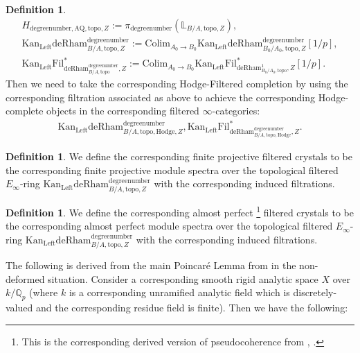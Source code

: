 \documentclass[11pt]{book}
\theoremstyle{definition}
\newtheorem{definition}[theorem]{Definition}
\numberwithin{equation}{section}
\begin{document}
\begin{definition}
\begin{align}
H_{\text{degreenumber},{\mathrm{AQ}},\mathrm{topo},Z}:=\pi_\text{degreenumber} (\mathbb{L}_{B/A,\mathrm{topo},Z}),	\\
\mathrm{Kan}_\mathrm{Left}\mathrm{deRham}^\text{degreenumber}_{B/A,\mathrm{topo},Z}:=\mathrm{Colim}_{A_0\rightarrow B_0}\mathrm{Kan}_\mathrm{Left}\mathrm{deRham}^\text{degreenumber}_{B_0/A_0,\mathrm{topo},Z}[1/p],\\
\mathrm{Kan}_\mathrm{Left}\mathrm{Fil}^*_{\mathrm{deRham}^\text{degreenumber}_{B/A,\mathrm{topo}},Z}:=\mathrm{Colim}_{A_0\rightarrow B_0}\mathrm{Kan}_\mathrm{Left}\mathrm{Fil}^*_{\mathrm{deRham}^1_{B_0/A_0,\mathrm{topo}},Z}[1/p].
\end{align}
Then we need to take the corresponding Hodge-Filtered completion by using the corresponding filtration associated as above to achieve the corresponding Hodge-complete objects in the corresponding filtered $\infty$-categories:
\begin{align}
\mathrm{Kan}_\mathrm{Left}{\mathrm{deRham}}^\text{degreenumber}_{B/A,\mathrm{topo,Hodge},Z},\mathrm{Kan}_\mathrm{Left}\mathrm{Fil}^*_{{\mathrm{deRham}}^\text{degreenumber}_{B/A,\mathrm{topo,Hodge}},Z}.	
\end{align} 	
\end{definition}


\begin{definition}
We define the corresponding finite projective filtered crystals to be the corresponding finite projective module spectra over the topological filtered $E_\infty$-ring $\mathrm{Kan}_\mathrm{Left}\mathrm{deRham}^\text{degreenumber}_{B/A,\mathrm{topo},Z}$ with the corresponding induced filtrations.	
\end{definition}


\begin{definition}
We define the corresponding almost perfect \footnote{This is the corresponding derived version of pseudocoherence from \cite{12Lu1}, \cite{12Lu2}.} filtered crystals to be the corresponding almost perfect module spectra over the topological filtered $E_\infty$-ring $\mathrm{Kan}_\mathrm{Left}\mathrm{deRham}^\text{degreenumber}_{B/A,\mathrm{topo},Z}$ with the corresponding induced filtrations.	
\end{definition}

\indent The following is derived from the main Poincar\'e Lemma from \cite[Theorem 1.2]{12GL} in the non-deformed situation. Consider a corresponding smooth rigid analytic space $X$ over $k/\mathbb{Q}_p$ (where $k$ is a corresponding unramified analytic field which is discretely-valued and the corresponding residue field is finite). Then we have the following:
\end{document}
